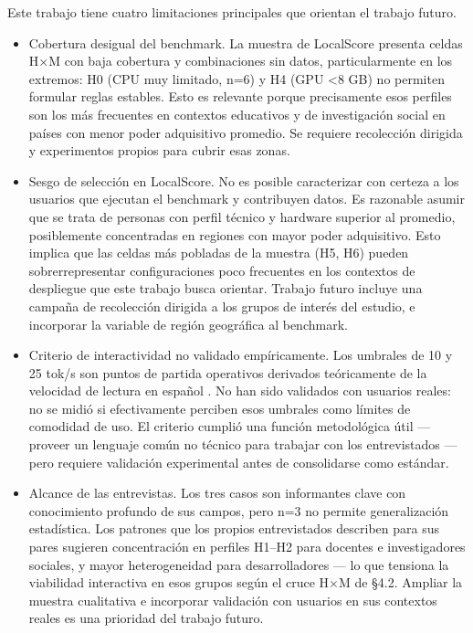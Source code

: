 \documentclass{llncs}
\begin{document}
Este trabajo tiene cuatro limitaciones principales que orientan el trabajo futuro.
\begin{itemize}
    \item Cobertura desigual del benchmark. La muestra de LocalScore presenta celdas H×M con baja cobertura y combinaciones sin datos, particularmente en los extremos: H0 (CPU muy limitado, n=6) y H4 (GPU \textless8 GB) no permiten formular reglas estables. Esto es relevante porque precisamente esos perfiles son los más frecuentes en contextos educativos y de investigación social en países con menor poder adquisitivo promedio. Se requiere recolección dirigida y experimentos propios para cubrir esas zonas.
    \item Sesgo de selección en LocalScore. No es posible caracterizar con certeza a los usuarios que ejecutan el benchmark y contribuyen datos. Es razonable asumir que se trata de personas con perfil técnico y hardware superior al promedio, posiblemente concentradas en regiones con mayor poder adquisitivo. Esto implica que las celdas más pobladas de la muestra (H5, H6) pueden sobrerrepresentar configuraciones poco frecuentes en los contextos de despliegue que este trabajo busca orientar. Trabajo futuro incluye una campaña de recolección dirigida a los grupos de interés del estudio, e incorporar la variable de región geográfica al benchmark.
    \item Criterio de interactividad no validado empíricamente. Los umbrales de 10 y 25 tok/s son puntos de partida operativos derivados teóricamente de la velocidad de lectura en español \parencite{brysbaert2019}. No han sido validados con usuarios reales: no se midió si efectivamente perciben esos umbrales como límites de comodidad de uso. El criterio cumplió una función metodológica útil — proveer un lenguaje común no técnico para trabajar con los entrevistados — pero requiere validación experimental antes de consolidarse como estándar.
    \item Alcance de las entrevistas. Los tres casos son informantes clave con conocimiento profundo de sus campos, pero n=3 no permite generalización estadística. Los patrones que los propios entrevistados describen para sus pares sugieren concentración en perfiles H1--H2 para docentes e investigadores sociales, y mayor heterogeneidad para desarrolladores — lo que tensiona la viabilidad interactiva en esos grupos según el cruce H×M de §4.2. Ampliar la muestra cualitativa e incorporar validación con usuarios en sus contextos reales es una prioridad del trabajo futuro.
\end{itemize}
\end{document}

